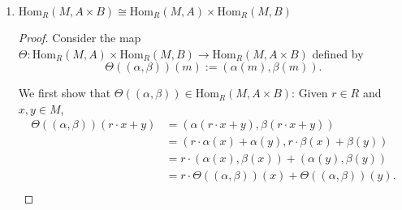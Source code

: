 \documentclass{article}
\begin{document}
\begin{enumerate}[label={\bf(\alph*)}]
\begin{proof}
        Finally we show that $\Theta$ is surjective. Let $\gamma:A\times
        B\rightarrow M$ be an $R$-module homomorphism. Consider the map
        $\alpha:A\rightarrow M$ defined by $\alpha(a)=\gamma((a,0))$. Then
        $\alpha$ is an $R$-module homomorphism, because given $r\in R$ and
        $a_1,a_2\in A$,
        \begin{align*}
          \alpha(r\cdot a_1+a_2) &=\gamma((r\cdot a_1+a_2,0)\\
          &=r\cdot\gamma((a_1,0)) +\gamma((a_2,0))\\
          &=r\cdot\alpha(a_1) +\alpha(a_2).\\
        \end{align*}

        Similarly, the map $\beta:B\rightarrow M$ defined by
        $\beta(b)=\gamma((0,b))$ is an $R$-module homomorphism. We show
        that $(\alpha,\beta)$ is a pre-image of $\gamma$: Given any $a\in
        A$ and $b\in B$,
        \begin{align*}
          \Theta((\alpha,\beta))(a,b) &=\alpha(a)+\beta(b)\\
          &=\gamma((a,0)) +\gamma((0,b))\\
          &=\gamma((a,b)).\\
        \end{align*}
      \end{proof}

    \item $\text{Hom}_R(M,A\times B) \cong\text{Hom}_R(M,A)
      \times\text{Hom}_R(M,B)$

      \begin{proof}
        Consider the map $\Theta:\text{Hom}_R(M,A) \times\text{Hom}_R(M,B)
        \rightarrow \text{Hom}_R(M,A\times B)$ defined by
        \[\Theta((\alpha,\beta))(m) :=(\alpha(m),\beta(m)).\]

        We first show that $\Theta((\alpha,\beta))\in\text{Hom}_R(M,A\times
        B)$: Given $r\in R$ and $x,y\in M$,
        \begin{align*}
           \Theta((\alpha,\beta))(r\cdot x+y) &=(\alpha(r\cdot x+y),
            \beta(r\cdot x+y))\\
          &=(r\cdot\alpha(x)+\alpha(y), r\cdot\beta(x)+\beta(y))\\
          &=r\cdot(\alpha(x),\beta(x)) +(\alpha(y),\beta(y))\\
          &=r\cdot\Theta((\alpha,\beta))(x) +\Theta((\alpha,\beta))(y).\\
        \end{align*}


\end{proof}
\end{enumerate}
\end{document}
